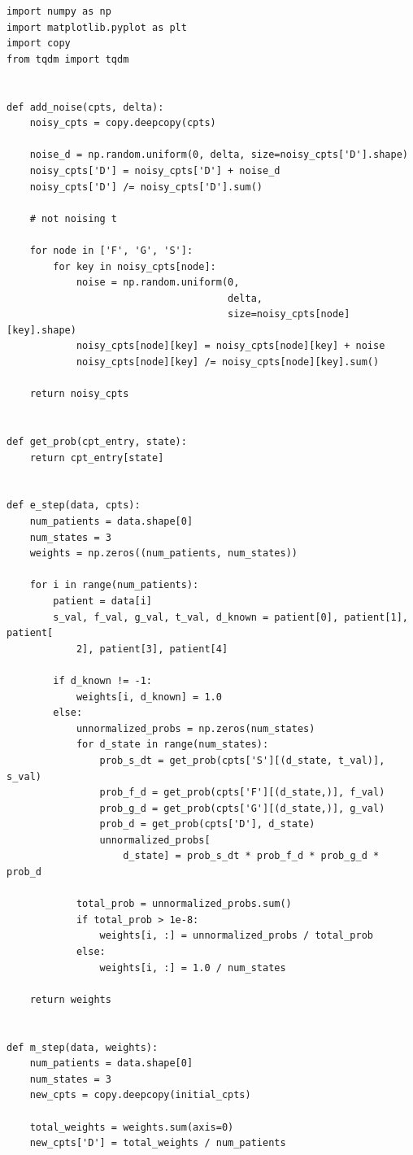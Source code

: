 \documentclass[11pt]{article}
\begin{document}
\begin{verbatim}
import numpy as np
import matplotlib.pyplot as plt
import copy
from tqdm import tqdm


def add_noise(cpts, delta):
    noisy_cpts = copy.deepcopy(cpts)

    noise_d = np.random.uniform(0, delta, size=noisy_cpts['D'].shape)
    noisy_cpts['D'] = noisy_cpts['D'] + noise_d
    noisy_cpts['D'] /= noisy_cpts['D'].sum()

    # not noising t

    for node in ['F', 'G', 'S']:
        for key in noisy_cpts[node]:
            noise = np.random.uniform(0,
                                      delta,
                                      size=noisy_cpts[node][key].shape)
            noisy_cpts[node][key] = noisy_cpts[node][key] + noise
            noisy_cpts[node][key] /= noisy_cpts[node][key].sum()

    return noisy_cpts


def get_prob(cpt_entry, state):
    return cpt_entry[state]


def e_step(data, cpts):
    num_patients = data.shape[0]
    num_states = 3
    weights = np.zeros((num_patients, num_states))

    for i in range(num_patients):
        patient = data[i]
        s_val, f_val, g_val, t_val, d_known = patient[0], patient[1], patient[
            2], patient[3], patient[4]

        if d_known != -1:
            weights[i, d_known] = 1.0
        else:
            unnormalized_probs = np.zeros(num_states)
            for d_state in range(num_states):
                prob_s_dt = get_prob(cpts['S'][(d_state, t_val)], s_val)
                prob_f_d = get_prob(cpts['F'][(d_state,)], f_val)
                prob_g_d = get_prob(cpts['G'][(d_state,)], g_val)
                prob_d = get_prob(cpts['D'], d_state)
                unnormalized_probs[
                    d_state] = prob_s_dt * prob_f_d * prob_g_d * prob_d

            total_prob = unnormalized_probs.sum()
            if total_prob > 1e-8:
                weights[i, :] = unnormalized_probs / total_prob
            else:
                weights[i, :] = 1.0 / num_states

    return weights


def m_step(data, weights):
    num_patients = data.shape[0]
    num_states = 3
    new_cpts = copy.deepcopy(initial_cpts)

    total_weights = weights.sum(axis=0)
    new_cpts['D'] = total_weights / num_patients


\end{verbatim}
\end{document}
